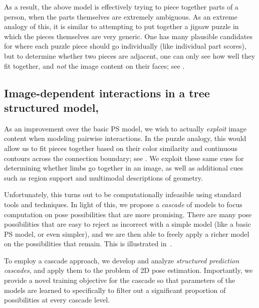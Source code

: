 As a result, the above model is effectively trying to piece together parts of a 
person, when the parts themselves are extremely ambiguous. As an extreme 
analogy of this, it is similar to attempting to put together a jigsaw puzzle in 
which the pieces themselves are very generic.  One has many plausible 
candidates for where each puzzle piece should go individually (like individual 
part scores), but to determine whether two pieces are adjacent, one can only 
see how well they fit together, and {\em not } the  image content on their 
faces; see .


\subsection{Image-dependent interactions in a tree structured 
model,~}
\label{sec:contrib1}
As an improvement over the basic PS model, we wish to actually {\em exploit } 
image content when modeling pairwise interactions.  In the puzzle analogy, this 
would allow us to fit pieces together based on their color similarity and 
continuous contours across the connection boundary; see .  We exploit these same cues for determining whether limbs go together in 
an image, as well as additional cues such as region support and multimodal 
descriptions of geometry.

Unfortunately, this turns out to be computationally infeasible using standard 
tools and techniques.  In light of this, we propose a {\em cascade} of models 
to focus computation on pose possibilities that are more promising.  There are 
many pose possibilities that are easy to reject as incorrect with a simple 
model (like a basic PS model, or even simpler), and we are then able to freely 
apply a richer model on the possibilities that remain.  This is illustrated 
in~.

To employ a cascade approach, we develop and analyze {\em structured prediction 
cascades}, and apply them to the problem of 2D pose estimation. Importantly, we 
provide a novel training objective for the cascade so that parameters of the 
models are learned to specifically to filter out a significant proportion of 
possibilities at every cascade level. 

